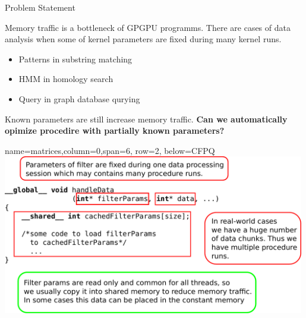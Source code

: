 \documentclass[a0paper,portrait]{baposter}
\begin{document}
\begin{poster}
\begin{posterbox}[name=CFPQ,column=0,row=0, span=4]{Problem Statement}

  Memory traffic is a bottleneck of GPGPU programms.
  There are cases of data analysis when some of kernel parameters are fixed during many kernel runs.
  \begin{itemize}
    \item Patterns in substring matching
    \item HMM in homology search
    \item Query in graph database qurying
  \end{itemize}
  Known parameters are still increase memory traffic. \textbf{Can we automatically opimize procedire with partially known parameters?}
\end{posterbox}

{name=matrices,column=0,span=6, row=2, below=CFPQ}%
{
\includegraphics[width=0.99\textwidth]{CodeSample1.pdf}
}



\end{poster}
\end{document}

